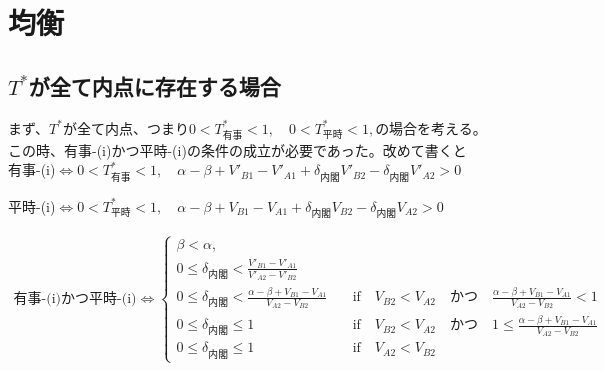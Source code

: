 \documentclass[main.tex]{subfiles}
\begin{document}
\section{均衡}


\subsection{$T^*$が全て内点に存在する場合}

\bigskip
まず、$T^*$が全て内点、つまり$0<T^*_{有事}<1,\quad 0<T^*_{平時}<1,$の場合を考える。\\
この時、有事-(i)かつ平時-(i)の条件の成立が必要であった。改めて書くと\\

有事-(i)$\Leftrightarrow 0<T^*_{有事}<1,\quad \alpha-\beta + V'_{B1}-V'_{A1} + \delta_{内閣}V'_{B2} - \delta_{内閣}V'_{A2} > 0$

平時-(i)$\Leftrightarrow 0<T^*_{平時}<1,\quad \alpha-\beta + V_{B1}-V_{A1} + \delta_{内閣}V_{B2} - \delta_{内閣}V_{A2} > 0$

\begin{align*}
    \text{有事-(i)かつ平時-(i)} \Leftrightarrow 
    \begin{cases}
        \beta < \alpha, \\
        0 \le \delta_{内閣} < \frac{V'_{B1}-V'_{A1}}{V'_{A2} - V'_{B2}}\\
        0 \le \delta_{内閣} < \frac{\alpha-\beta + V_{B1}-V_{A1}}{V_{A2} - V_{B2}} \quad&\text{if}\quad V_{B2} < V_{A2} \quad{かつ}\quad \frac{\alpha-\beta + V_{B1}-V_{A1}}{V_{A2} - V_{B2}}<1\\
        0 \le \delta_{内閣} \le 1 \quad&\text{if}\quad V_{B2} < V_{A2} \quad{かつ}\quad 1 \le \frac{\alpha-\beta + V_{B1}-V_{A1}}{V_{A2} - V_{B2}}\\
        0 \le \delta_{内閣} \le 1 \quad&\text{if}\quad V_{A2} < V_{B2}
    \end{cases}
\end{align*}
\end{document}
